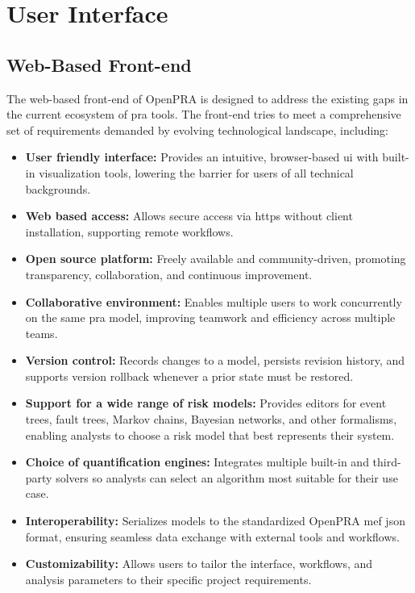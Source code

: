 \section{User Interface}

\subsection{Web-Based Front-end}

The web-based front-end of OpenPRA is designed to address the existing gaps in the current ecosystem of \acrshort{pra} tools. The front-end tries to meet a comprehensive set of requirements demanded by evolving technological landscape, including:

\begin{itemize}
\item \textbf{User friendly interface:} Provides an intuitive, browser-based \acrshort{ui} with built-in visualization tools, lowering the barrier for users of all technical backgrounds.
\item \textbf{Web based access:} Allows secure access via \acrshort{https} without client installation, supporting remote workflows.
\item \textbf{Open source platform:} Freely available and community-driven, promoting transparency, collaboration, and continuous improvement.
\item \textbf{Collaborative environment:} Enables multiple users to work concurrently on the same \acrshort{pra} model, improving teamwork and efficiency across multiple teams.
\item \textbf{Version control:} Records changes to a model, persists revision history, and supports version rollback whenever a prior state must be restored.  
\item \textbf{Support for a wide range of risk models:} Provides editors for event trees, fault trees, Markov chains, Bayesian networks, and other formalisms, enabling analysts to choose a risk model that best represents their system.  
\item \textbf{Choice of quantification engines:} Integrates multiple built-in and third-party solvers so analysts can select an algorithm most suitable for their use case.  
\item \textbf{Interoperability:} Serializes models to the standardized OpenPRA \acrshort{mef} \acrshort{json} format, ensuring seamless data exchange with external tools and workflows.
\item \textbf{Customizability:} Allows users to tailor the interface, workflows, and analysis parameters to their specific project requirements.
\end{itemize}

